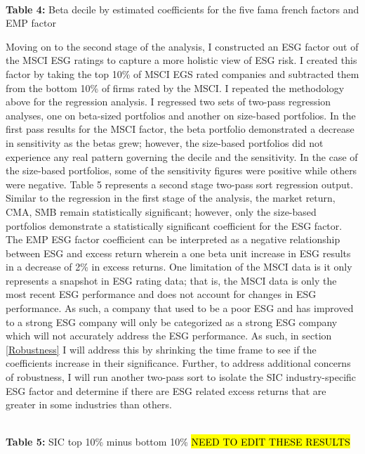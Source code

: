 \begin{center}
    \paperspacingnarrow
    \\
    \textbf{Table 4:} Beta decile by estimated coefficients for the  five fama french factors and EMP factor\\
    \paperspacingwide
\end{center}

Moving on to the second stage of the analysis, I constructed an ESG factor out of the MSCI ESG ratings to capture a more holistic view of ESG risk. I created this factor by taking the top 10\% of MSCI EGS rated companies and subtracted them from the bottom 10\% of firms rated by the MSCI. I repeated the methodology above for the regression analysis. I  regressed two sets of two-pass regression analyses, one on beta-sized portfolios and another on size-based portfolios. In the first pass results for the MSCI factor, the beta portfolio demonstrated a decrease in sensitivity as the betas grew; however, the size-based portfolios did not experience any real pattern governing the decile and the sensitivity. In the case of the size-based portfolios, some of the sensitivity figures were positive while others were negative. Table 5 represents a second stage two-pass sort regression output. Similar to the regression in the first stage of the analysis, the market return, CMA, SMB remain statistically significant; however, only the size-based portfolios demonstrate a statistically significant coefficient for the ESG factor.  The EMP ESG factor coefficient can be interpreted as a negative relationship between ESG and excess return wherein a one beta unit increase in ESG results in a decrease of 2\% in excess returns. One limitation of the MSCI data is it only represents a snapshot in ESG rating data; that is, the MSCI data is only the most recent ESG performance and does not account for changes in ESG performance. As such, a company that used to be a  poor ESG and has improved to a strong ESG company will only be categorized as a strong ESG company which will not accurately address the ESG performance.  As such, in section \ref{Robustness} I will address this by shrinking the time frame to see if the coefficients increase in their significance. Further,  to address additional concerns of robustness, I will run another two-pass sort to isolate the SIC industry-specific ESG factor and determine if there are ESG related excess returns that are greater in some industries than others. 

\begin{center}
    \paperspacingnarrow
    \\
    \textbf{Table 5:} SIC top 10\% minus bottom 10\% \hl{NEED TO EDIT THESE RESULTS}
    \paperspacingwide
\end{center}